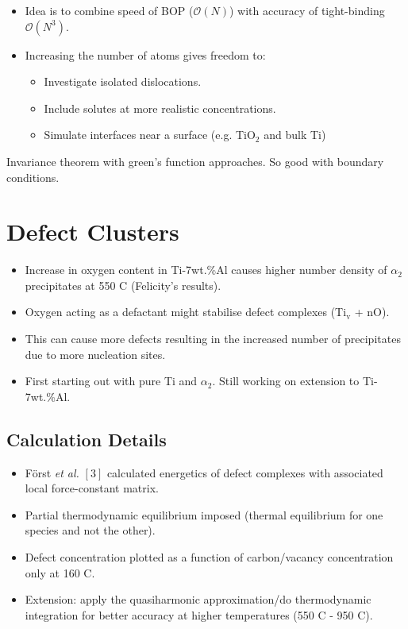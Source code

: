 \documentclass[11pt]{article}
\begin{document}
\begin{itemize}
\item Idea is to combine speed of BOP (\(\mathcal{O}(N)\)) with accuracy of
tight-binding \(\mathcal{O}(N^3)\).
\item Increasing the number of atoms gives freedom to:
\begin{itemize}
\item Investigate isolated dislocations.
\item Include solutes at more realistic concentrations.
\item Simulate interfaces near a surface (e.g. TiO\(_2\) and
bulk Ti)
\end{itemize}
\end{itemize}
\begin{NOTES}
Invariance theorem with green's function approaches. So good with boundary
conditions. 
\end{NOTES}

\section*{Defect Clusters}
\label{sec:orgec2ee65}

\begin{itemize}
\item Increase in oxygen content in Ti-7wt.\%Al causes higher number density of
\(\alpha_2\) precipitates at 550\textdegree{} C (Felicity's results).
\item Oxygen acting as a defactant might stabilise defect complexes (Ti\(_{\text{v}}\) + nO).
\item This can cause more defects resulting in the increased number of precipitates due to more nucleation sites.
\item First starting out with pure Ti and \(\alpha_2\). Still working on extension to Ti-7wt.\%Al.
\end{itemize}


\subsection*{Calculation Details}
\label{sec:org7c88fdb}
\begin{itemize}
\item Först \emph{et al.} \([3]\) calculated energetics of defect complexes with associated local
force-constant matrix.
\item Partial thermodynamic equilibrium imposed (thermal equilibrium for one species and not the other).
\item Defect concentration plotted as a function of carbon/vacancy concentration
only at 160\textdegree{} C.
\item Extension: apply the quasiharmonic approximation/do thermodynamic integration
for better accuracy at higher temperatures (550\textdegree{} C - 950\textdegree{} C).
\end{itemize}
\end{document}
